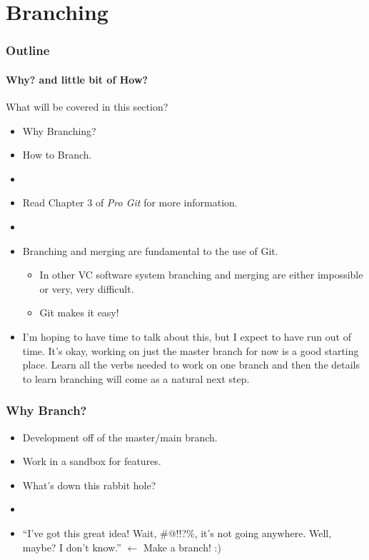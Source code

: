 \section{Branching}

\begin{frame}[t]
  \frametitle{Outline}
  \framesubtitle{Why? and little bit of How?}
\end{frame}

\begin{frame}[t]{What will be covered in this section?}
  \begin{itemize}
    \item Why Branching?
    \item How to Branch.
    \item[]
    \item Read Chapter 3 of {\it Pro Git} for more information.
    \item[]
    \item Branching and merging are fundamental to the use of Git.  
      \begin{itemize}
        \item In other VC software system branching and merging are either
          impossible or very, very difficult.
        \item Git makes it easy!
      \end{itemize}

    \item I'm hoping to have time to talk about this, but I expect to have run
      out of time.  It's okay, working on just the master branch for now is a
      good starting place.  Learn all the verbs needed to work on one branch and
      then the details to learn branching will come as a natural next step.
  \end{itemize}
\end{frame}

\begin{frame}[t]
  \frametitle{Why Branch?}
  \begin{itemize}
    \item Development off of the master/main branch.
    \item Work in a sandbox for features.
    \item What's down this rabbit hole?
    \item[]
    \item ``I've got this great idea!  Wait, \#$@$!!?\%, it's not going
      anywhere.  Well, maybe?  I don't know.'' $\leftarrow$ Make a branch! :)
  \end{itemize}
\end{frame}

